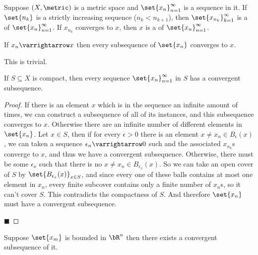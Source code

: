 \documentclass[10pt]{article}
\begin{document}
\begin{defn*}

    Suppose $(X,\metric)$ is a metric space and $\set{x_n}_{n=1}^\infty$ is a sequence in it.
    If $\set{n_k}$ is a strictly increasing sequence ($n_k<n_{k+1}$), then $\set{x_{n_k}}_{k=1}^\infty$ is a  of $\set{x_n}_{n=1}^\infty$.
    If $x_{n_k}$ converges to $x$, then $x$ is a  of $\set{x_n}_{n=1}^\infty$.

\end{defn*}

\begin{prop*}

    If $x_n\varrightarrow x$ then every subsequence of $\set{x_n}$ converges to $x$.

\end{prop*}

This is trivial.

\begin{thrm*}

    If $S\subseteq X$ is compact, then every sequence $\set{x_n}_{n=1}^\infty$ in $S$ has a convergent subsequence.

\end{thrm*}

\begin{proof}

    If there is an element $x$ which is in the sequence an infinite amount of times, we can construct a subsequence of all of its instances, and this subsequence converges to $x$.
    Otherwise there are an infinite number of different elements in $\set{x_n}$.
    Let $x\in S$, then if for every $\epsilon>0$ there is an element $x\neq x_n\in B_\epsilon(x)$, we can taken a sequence $\epsilon_n\varrightarrow0$ such and the associated $x_{n_k}$s converge to $x$,
    and thus we have a convergent subsequence.
    Otherwise, there must be some $\epsilon_x$ such that there is no $x\neq x_n\in B_{\epsilon_x}(x)$.
    So we can take an open cover of $S$ by $\set{B_{\epsilon_x}(x)}_{x\in S}$, and since every one of these balls contains at most one element in $x_n$, every finite subcover contains only a finite
    number of $x_n$s, so it can't cover $S$.
    This contradicts the compactness of $S$.
    And therefore $\set{x_n}$ must have a convergent subsequence.

    \hfill$\blacksquare$

\end{proof}

\begin{thrm*}

    Suppose $\set{x_m}$ is bounded in $\bR^n$ then there exists a convergent subsequence of it.

\end{thrm*}
\end{document}
